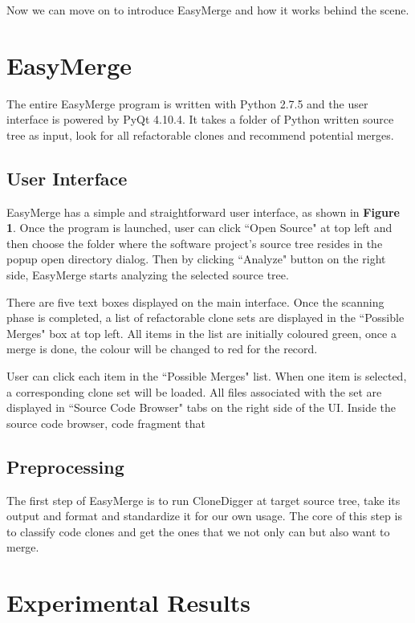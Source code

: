 \documentclass{acm_proc_article-sp}
\begin{document}
Now we can move on to introduce EasyMerge and how it works behind the scene.


\section{EasyMerge}
The entire EasyMerge program is written with Python 2.7.5 and the user interface is powered by PyQt 4.10.4.
It takes a folder of Python written source tree as input, look for all refactorable clones and recommend potential merges.  

\subsection{User Interface}
EasyMerge has a simple and straightforward user interface, as shown in {\bf Figure 1}.
Once the program is launched, user can click ``Open Source" at top left and then choose the folder 
where the software project's source tree resides in the popup open directory dialog.
Then by clicking ``Analyze" button on the right side, EasyMerge starts analyzing the selected source tree.

There are five text boxes displayed on the main interface.
Once the scanning phase is completed, a list of refactorable clone sets are displayed in the ``Possible Merges" box at top left.
All items in the list are initially coloured green, once a merge is done, the colour will be changed to red for the record.

User can click each item in the ``Possible Merges" list. When one item is selected, a corresponding clone set will be loaded. All files
associated with the set are displayed in ``Source Code Browser" tabs on the right side of the UI.
Inside the source code browser, code fragment that 


\subsection{Preprocessing}
The first step of EasyMerge is to run CloneDigger at target source tree, take its output and format and standardize it for our own usage.
The core of this step is to classify code clones and get the ones that we not only can but also want to merge. 


\section{Experimental Results}

\end{document}
